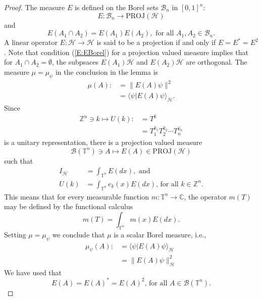 \documentclass{birkmult}
\theoremstyle{definition}
\theoremstyle{remark}
\numberwithin{equation}{section}
\begin{document}
\begin{proof}
The measure $E$ is defined on the Borel sets $\mathcal{B}_{n}$ in $[0,1]^{n}$:
\[
  E:\mathcal{B}_{n} \to \text{PROJ}(\mathcal{H})
\]
and 
\begin{equation}
\label{E:EBorel}
  E(A_{1} \cap A_{2}) = E(A_{1})E(A_{2}), \text{ for all }A_{1}, A_{2} \in 
  \mathcal{B}_{n}.
\end{equation}
A linear operator $E:\mathcal{H} \to \mathcal{H}$ is said to be a projection
if and only if $E=E^{*}=E^{2}$.  Note that condition (\ref{E:EBorel}) for
a projection valued measure implies that for $A_{1} \cap A_{2} = \emptyset$,
the subpsaces $E(A_{1})\mathcal{H}$ and $E(A_{2})\mathcal{H}$ are 
orthogonal.
The measure $\mu=\mu_{\psi}$ in the conclusion in the lemma is 
\begin{align*}
  \mu(A) :&= \|E(A)\psi\|^{2} \\
         &= \langle \psi | E(A)\psi \rangle_{\mathcal{H}}.
\end{align*}
Since 
\begin{align*}
\label{E:kUT}
  \mathbb{Z}^{n} \ni k \mapsto U(k) :&= T^{k} \\
                                    &= T_{1}^{k_{1}}T_{2}^{k_{2}} \cdots 
                                       T_{n}^{k_{n}}
\end{align*}
is a unitary representation, there is a projection valued measure
\[
  \mathcal{B}(\mathbb{T}^{n}) \ni A \mapsto E(A) \in \text{PROJ}(\mathcal{H}) 
\]
such that
\begin{align*}
  I_{\mathcal{H}} &= \int_{\mathbb{T}^{n}}E(dx), \text{ and} \\
             U(k) &= \int_{\mathbb{T}^{n}}e_{k}(x)E(dx) \text{, for all } 
  k \in \mathbb{Z}^{n}.
\end{align*}
This means that for every measurable function 
$m:\mathbb{T}^{n} \to \mathbb{C}$, the operator $m(T)$ may be defined by the
functional calculus
\begin{equation}
\label{E:fuctcalc}
  m(T) = \int_{\mathbb{T}^{n}}m(x)E(dx).
\end{equation}
Setting $\mu=\mu_{\psi}$ we conclude that $\mu$ is a scalar Borel measure,
i.e., 
\begin{align}
\label{E:mupsiE}
  \mu_{\psi}(A) :&= \langle \psi | E(A)\psi \rangle_{\mathcal{H}} \\
              &=\|E(A)\psi\|_{\mathcal{H}}^{2}
\end{align}
We have used that
\begin{equation}
\label{E:E(A)}
  E(A)=E(A)^{*}=E(A)^{2} \text{, for all } A \in \mathcal{B}(\mathbb{T}^{n}).
\end{equation}


\end{proof}
\end{document}
